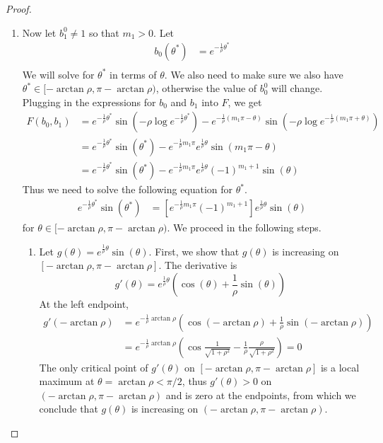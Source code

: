 \documentclass[thesis.tex]{subfiles}
\begin{document}
\begin{lemma}
\begin{proof}
\begin{enumerate}
	\item Now let $b_1^0 \neq 1$ so that $m_1 > 0$. Let
	\begin{align*}
	b_0(\theta^*) &= e^{-\frac{1}{\rho} \theta^* } \\
	\end{align*}
	We will solve for $\theta^*$ in terms of $\theta$. We also need to make sure we also have $\theta^* \in [-\arctan \rho,\pi - \arctan \rho)$, otherwise the value of $b_0^0$ will change. Plugging in the expressions for $b_0$ and $b_1$ into $F$, we get
	\begin{align*}
	F(b_0, b_1) &= e^{ -\frac{1}{\rho}\theta^* } \sin\left( -\rho \log e^{ -\frac{1}{\rho}\theta^* }\right) - e^{ -\frac{1}{\rho}(m_1 \pi - \theta) }\sin \left( -\rho \log e^{ -\frac{1}{\rho}(m_1 \pi + \theta) } \right) \\
	&= e^{ -\frac{1}{\rho}\theta^* } \sin\left( \theta^* \right) - e^{ -\frac{1}{\rho} m_1 \pi} e^{ \frac{1}{\rho} \theta } \sin(m_1 \pi - \theta) \\
	&= e^{ -\frac{1}{\rho}\theta^* } \sin\left( \theta^* \right) - e^{ -\frac{1}{\rho} m_1 \pi } e^{ \frac{1}{\rho} \theta } (-1)^{m_1 + 1} \sin(\theta)
	\end{align*}
	Thus we need to solve the following equation for $\theta^*$.
	\begin{align}\label{thetastareq}
	e^{ -\frac{1}{\rho}\theta^* } \sin\left( \theta^* \right) &= \left[ e^{ -\frac{1}{\rho} m_1 \pi } (-1)^{m_1 + 1} \right] e^{ \frac{1}{\rho} \theta } \sin(\theta)
	\end{align}
	for $\theta \in [-\arctan \rho,\pi - \arctan \rho)$. We proceed in the following steps.
	\begin{enumerate}
		\item Let $g(\theta) = e^{ \frac{1}{\rho} \theta } \sin(\theta)$. First, we show that $g(\theta)$ is increasing on $[-\arctan \rho,\pi - \arctan \rho]$. The derivative is 
		\[
		g'(\theta) = e^{ \frac{1}{\rho} \theta } \left( \cos(\theta) + \frac{1}{\rho} \sin(\theta)\right)
		\]
		At the left endpoint,
		\begin{align*}
		g'(-\arctan \rho) &= e^{ -\frac{1}{\rho} \arctan \rho } \left(\cos(-\arctan \rho) + \frac{1}{\rho} \sin(-\arctan \rho)\right) \\
		&= e^{ -\frac{1}{\rho} \arctan \rho } \left(\cos\frac{1}{\sqrt{1 + \rho^2}} - \frac{1}{\rho} \frac{\rho}{\sqrt{1 + \rho^2}}\right) = 0
		\end{align*}
		The only critical point of $g'(\theta)$ on $[-\arctan \rho,\pi - \arctan \rho]$ is a local maximum at $\theta = \arctan \rho < \pi/2$, thus $g'(\theta) > 0$ on $(-\arctan \rho,\pi - \arctan \rho)$ and is zero at the endpoints, from which we conclude that $g(\theta)$ is increasing on $(-\arctan \rho,\pi - \arctan \rho)$.
		

\end{enumerate}
\end{enumerate}
\end{proof}
\end{lemma}
\end{document}

